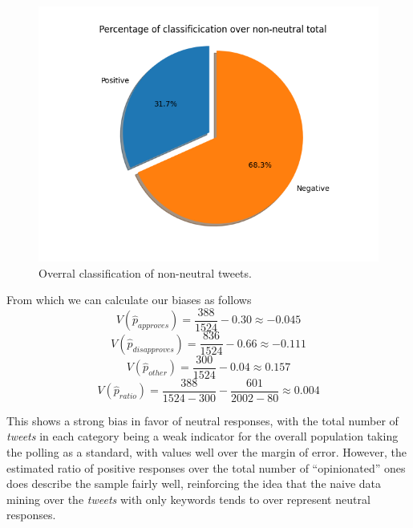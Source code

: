\documentclass[conference]{IEEEtran}
\begin{document}
\begin{figure}[H]
\centering
\includegraphics[width=\linewidth]{./pieTweet.png}
\caption{\label{fig:nonneutral}Overral classification of non-neutral tweets.}
\end{figure}

From which we can calculate our biases as follows
$$ V(\hat{p}_{approves}) = \frac{388}{1524} - 0.30 \approx -0.045 $$
$$ V(\hat{p}_{disapproves}) = \frac{836}{1524} - 0.66 \approx -0.111 $$
$$ V(\hat{p}_{other}) = \frac{300}{1524} - 0.04 \approx 0.157 $$
$$ V(\hat{p}_{ratio}) = \frac{388}{1524 - 300} - \frac{601}{2002 - 80} \approx 0.004 $$

This shows a strong bias in favor of neutral responses, with the total number of \emph{tweets} in each category being a weak indicator for the overall population taking the polling as a standard, with values well over the margin of error. However, the estimated ratio of positive responses over the total number of ``opinionated'' ones does describe the sample fairly well, reinforcing the idea that the naive data mining over the \emph{tweets} with only keywords tends to over represent neutral responses.

\printbibliography{}
\end{document}
